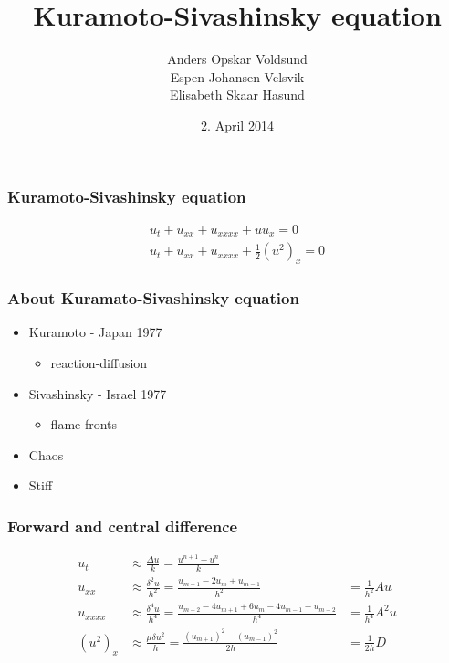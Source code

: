 \documentclass[screen]{beamer}
\title[Kuramoto-Sivashinsky]%
{Kuramoto-Sivashinsky equation}
\author[Author, Anders] %
{Anders Opskar Voldsund \\Espen Johansen Velsvik \\Elisabeth Skaar Hasund}
\date{2. April 2014}
\begin{document}
\begin{frame}
\titlepage

\end{frame}

\begin{frame}
\frametitle{Kuramoto-Sivashinsky equation}
\Large
\begin{align*}
u_t + u_{xx} + u_{xxxx} + uu_x = 0 \\
u_t + u_{xx} + u_{xxxx} + \frac{1}{2}(u^2)_x = 0
\end{align*}
\end{frame}


\begin{frame}
\frametitle{About Kuramato-Sivashinsky equation}
\begin{itemize}
\item Kuramoto - Japan 1977
\begin{itemize}
\item reaction-diffusion
\end{itemize}

\item Sivashinsky - Israel 1977
\begin{itemize}
\item flame fronts
\end{itemize}
\item Chaos
\item Stiff

\end{itemize}

\end{frame}


\begin{frame}
\frametitle{Forward and central difference}
\begin{align*}
u_t &\approx \frac{\Delta u}{k} = \frac{u^{n+1}-u^n}{k} \\
u_{xx} &\approx \frac{\delta^2 u}{h^2} = \frac{u_{m+1}-2u_{m}+u_{m-1}}{h^2} &= \frac{1}{h^2}Au \\
u_{xxxx} &\approx \frac{\delta^4 u}{h^4} = \frac{u_{m+2}-4u_{m+1}+6u_m-4u_{m-1}+u_{m-2}}{h^4} &= \frac{1}{h^4}A^2u\\
(u^2)_{x} &\approx \frac{\mu \delta u^2}{h} = \frac{(u_{m+1})^2-(u_{m-1})^2}{2h} &= \frac{1}{2h}D\\
\end{align*}
\end{frame}
\end{document}
